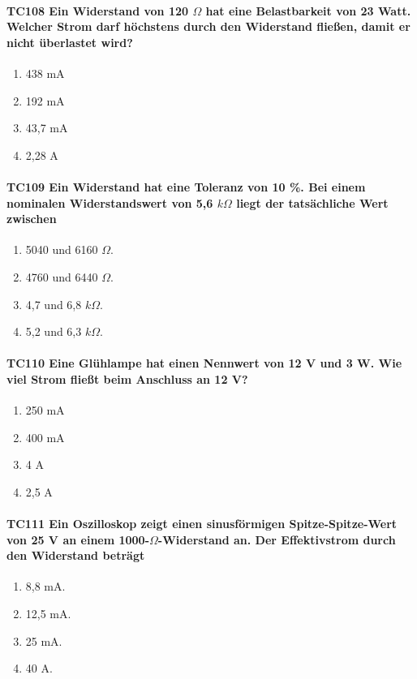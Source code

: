\documentclass[8pt]{article}
\begin{document}
\begin{enumerate}
\begin{enumerate}[nolistsep,label=\Alph*]
\paragraph*{TC108 Ein Widerstand von 120 $\Omega$ hat eine Belastbarkeit von 23 Watt. Welcher Strom darf höchstens durch den Widerstand fließen, damit er nicht überlastet wird?}
\begin{enumerate}[nolistsep,label=\Alph*]
\item 438 mA
\item 192 mA
\item 43,7 mA
\item 2,28 A
\end{enumerate}

\paragraph*{TC109 Ein Widerstand hat eine Toleranz von 10 \%. Bei einem nominalen Widerstandswert von 5,6 $k\Omega$ liegt der tatsächliche Wert zwischen}
\begin{enumerate}[nolistsep,label=\Alph*]
\item 5040 und 6160 $\Omega$.
\item 4760 und 6440 $\Omega$.
\item 4,7 und 6,8 $k\Omega$.
\item 5,2 und 6,3 $k\Omega$.
\end{enumerate}

\paragraph*{TC110 Eine Glühlampe hat einen Nennwert von 12 V und 3 W. Wie viel Strom fließt beim Anschluss an 12 V?}
\begin{enumerate}[nolistsep,label=\Alph*]
\item 250 mA
\item 400 mA
\item 4 A
\item 2,5 A
\end{enumerate}

\paragraph*{TC111 Ein Oszilloskop zeigt einen sinusförmigen Spitze-Spitze-Wert von 25 V an einem 1000-$\Omega$-Widerstand an. Der Effektivstrom durch den Widerstand beträgt}
\begin{enumerate}[nolistsep,label=\Alph*]
\item 8,8 mA.
\item 12,5 mA.
\item 25 mA.
\item 40 A.
\end{enumerate}


\end{enumerate}
\end{enumerate}
\end{document}
